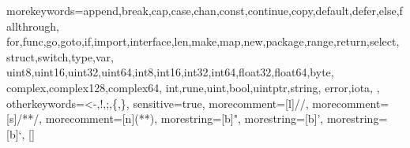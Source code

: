 \nobibintoc
\renewcommand*{\indexmark}{%
\markboth{\myfamily \typename{} \thechapter: \indexname}{\myfamily\indexname}%
}

\onecolindexfalse  %
\noindexintoc
\makeindex

\newcommand{\qquote}{{\scalefont{4.00}{``}}}
\expandafter\def\expandafter\quote\expandafter{\quote\em}


  {morekeywords={append,break,cap,case,chan,const,continue,copy,default,defer,else,fallthrough,%
  for,func,go,goto,if,import,interface,len,make,map,new,package,range,return,select,%
  struct,switch,type,var,%
  uint8,uint16,uint32,uint64,int8,int16,int32,int64,float32,float64,byte,%
  complex,complex128,complex64,%
  int,rune,uint,bool,uintptr,string,%
  error,iota,%
  },%
  otherkeywords={<-,!,;,\{,\}},%
    sensitive=true,%
    morecomment=[l]{//},%
    morecomment=[s]{/*}{*/},%
    morecomment=[n]{(*}{*)},%
    morestring=[b]",%
    morestring=[b]',%
    morestring=[b]`,%
  }[]%
\lstset{language=Go,inputencoding=utf8,extendedchars=false,texcl,escapechar=\|,basicstyle=\ttfamily,keywordstyle=\normalfont,numbers=none,numberblanklines=false,showstringspaces=false,breaklines=true,numberstyle=\small\ttfamily,xleftmargin=\parindent,xrightmargin=1em,linewidth=0.98\linewidth}

\newcommand{\coderemark}[1]{\qquad$\leftarrow \textit{\small #1}$}


\renewcommand{\ExerciseHeaderTitle}{\ExerciseTitle}
\renewcommand{\ExerciseHeaderLabel}{}
\renewcommand{\ExerciseName}{}	%
\renewcommand{\ExerciseHeaderNB}{\theExercise}
\renewcommand{\ExerciseHeader}{\vspace{.7ex}\noindent\textbf{Q\theExercise}. (\number\ExerciseDifficulty) \ExerciseTitle\quad%
\addcontentsline{ex}{exercise}{\numberline{\theExercise}(\number\ExerciseDifficulty) \ExerciseTitle}}
\renewcommand{\AnswerHeader}{\vspace{.7ex}\noindent\textbf{A\theExercise}.  (\number\ExerciseDifficulty) \ExerciseTitle\quad}

